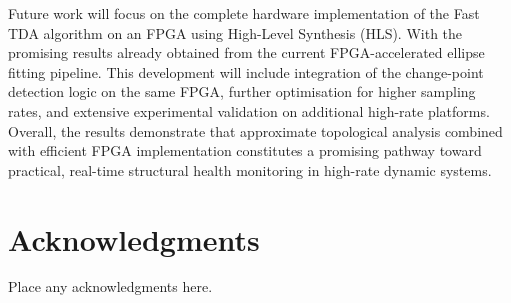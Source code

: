 \documentclass[colorlinks,upint,subscriptcorrection,varvw,hyphenate,balance,greek,russian,vietnamese,german]{asmeconf} %
\begin{document}
Future work will focus on the complete hardware implementation of the Fast TDA algorithm on an FPGA using High-Level Synthesis (HLS). With the promising results already obtained from the current FPGA-accelerated ellipse fitting pipeline. This development will include integration of the change-point detection logic on the same FPGA, further optimisation for higher sampling rates, and extensive experimental validation on additional high-rate platforms. Overall, the results demonstrate that approximate topological analysis combined with efficient FPGA implementation constitutes a promising pathway toward practical, real-time structural health monitoring in high-rate dynamic systems.








\section*{Acknowledgments}
Place any acknowledgments here.



\nocite{*}%





\end{document}
